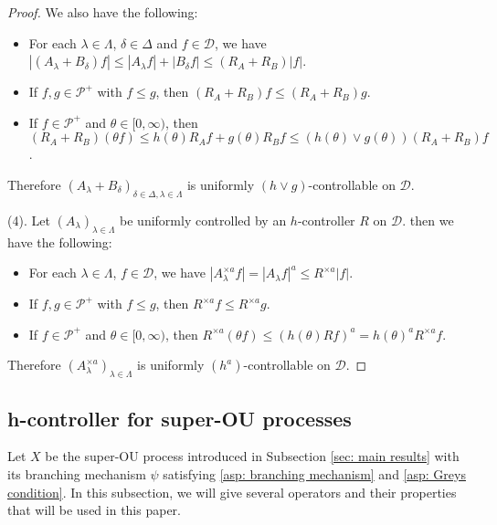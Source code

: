 \documentclass[12pt,a4paper]{amsart}
\theoremstyle{plain}
\theoremstyle{definition}
\numberwithin{equation}{section}
\begin{document}
\begin{proof}
    We also have the following:
\begin{itemize}
\item
    For each $\lambda \in \Lambda$, $\delta \in \Delta$ and $f\in \mathcal D$, we have $|(A_\lambda + B_\delta) f| \leq |A_\lambda f| + |B_\delta f| \leq (R_A + R_B) |f|$.
\item
    If $f,g \in \mathcal P^+$ with $f\leq g$, then $(R_A + R_B)f \leq (R_A + R_B) g$.
\item
    If $f \in \mathcal P^+$ and $\theta \in [0,\infty)$, then $(R_A + R_B) (\theta f) \leq h(\theta) R_Af + g(\theta) R_Bf \leq (h(\theta) \vee g(\theta)) (R_A+R_B)f $.
\end{itemize}
    Therefore $(A_\lambda + B_\delta)_{\delta\in \Delta, \lambda \in \Lambda}$ is uniformly $(h \vee g)$-controllable on $\mathcal D$.

    (4). Let $(A_\lambda)_{\lambda\in\Lambda}$ be uniformly controlled by an $h$-controller $R$ on $\mathcal D$.
    then we have the following:
\begin{itemize}
\item
    For each $\lambda \in \Lambda$, $f\in \mathcal D$, we have $|A_\lambda^{\times a} f| = |A_\lambda f|^a  \leq R^{\times a} |f|$.
\item
    If $f,g \in \mathcal P^+$ with $f\leq g$, then $R^{\times a}f \leq R^{\times a} g$.
\item
    If $f \in \mathcal P^+$ and $\theta \in [0,\infty)$, then $R^{\times a}(\theta f) \leq (h(\theta) R f)^a = h(\theta)^a R^{\times a}f$.
\end{itemize}
    Therefore $(A_\lambda^{\times a})_{\lambda \in \Lambda}$ is uniformly $(h^a)$-controllable on $\mathcal D$.
\end{proof}

\subsection{h-controller  for super-OU processes}
    Let $X$ be the super-OU process introduced in Subsection \ref{sec: main results} with its branching mechanism $\psi$ satisfying \ref{asp: branching mechanism} and \ref{asp: Greys condition}. 
	In this subsection, we will give several operators and their properties that will be used in this paper.
    
\end{document}
